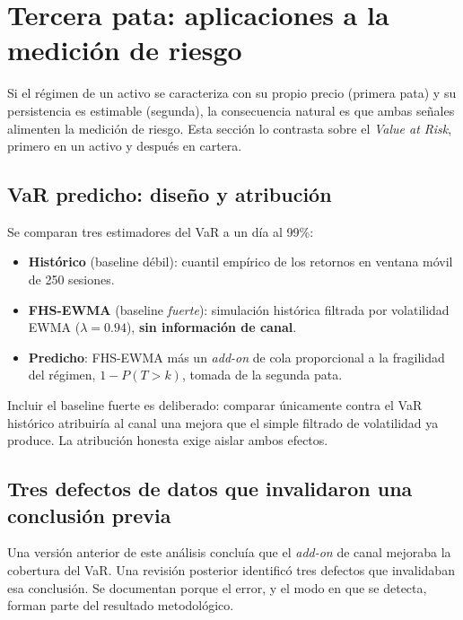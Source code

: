 \documentclass[11pt,a4paper]{article}
\begin{document}
\section{Tercera pata: aplicaciones a la medición de riesgo}
\label{sec:parte3}
Si el régimen de un activo se caracteriza con su propio precio (primera pata) y
su persistencia es estimable (segunda), la consecuencia natural es que ambas
señales alimenten la medición de riesgo. Esta sección lo contrasta sobre el
\emph{Value at Risk}, primero en un activo y después en cartera.

\subsection{VaR predicho: diseño y atribución}
Se comparan tres estimadores del VaR a un día al 99\%:

\begin{itemize}
  \item \textbf{Histórico} (baseline débil): cuantil empírico de los retornos en
    ventana móvil de 250 sesiones.
  \item \textbf{FHS-EWMA} (baseline \emph{fuerte}): simulación histórica filtrada
    por volatilidad EWMA ($\lambda=0.94$), \textbf{sin información de canal}.
  \item \textbf{Predicho}: FHS-EWMA más un \emph{add-on} de cola proporcional a
    la fragilidad del régimen, $1-P(T>k)$, tomada de la segunda pata.
\end{itemize}

Incluir el baseline fuerte es deliberado: comparar únicamente contra el VaR
histórico atribuiría al canal una mejora que el simple filtrado de volatilidad ya
produce. La atribución honesta exige aislar ambos efectos.

\subsection{Tres defectos de datos que invalidaron una conclusión previa}
\label{sec:defectos}
Una versión anterior de este análisis concluía que el \emph{add-on} de canal
mejoraba la cobertura del VaR. Una revisión posterior identificó tres defectos
que invalidaban esa conclusión. Se documentan porque el error, y el modo en que se
detecta, forman parte del resultado metodológico.
\end{document}
